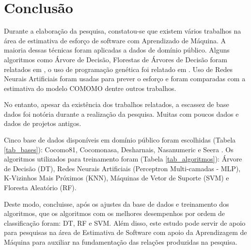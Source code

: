 \documentclass[12pt]{article}
\begin{document}
\section{Conclusão}\label{sec:figs}

Durante a elaboração da pesquisa, constatou-se que existem vários trabalhos na área de estimativa de esforço de software com Aprendizado de Máquina. A maioria dessas técnicas foram aplicadas a dados de domínio público. Alguns algoritmos como Árvore de Decisão, Florestas de Árvores de Decisão foram relatados em \cite{nassifetal:2013}, o uso de programação genética foi relatado em \cite{chavoyaetal:2012}. Uso de Redes Neurais Artificiais foram usadas para prever o esforço e foram comparadas com a estimativa do modelo COMOMO \cite{trontoetal:2007,bhatiaattri:2015} dentre outros trabalhos.

No entanto, apesar da existência dos trabalhos relatados, a escassez de base dados foi notória durante a realização da pesquisa. Muitas com poucos dados e dados de projetos antigos.

Cinco base de dados disponíveis em domínio público foram escolhidas (Tabela \ref{tab_bases}): Cocomo81, Cocomonasa, Desharnais, Nasanumeric e Seera \cite{promise:2005, nasanumeric:2014, seera:2020}. Os algoritmos utilizados para treinamento foram (Tabela \ref{tab_algoritmos}): Árvore de Decisão (DT), Redes Neurais Artificiais (Perceptron Multi-camadas - MLP), K-Vizinhos Mais Próximos (KNN), Máquinas de Vetor de Suporte (SVM) e Floresta Aleatório (RF).

Deste modo, concluisse, após os ajustes da base de dados e treinamento dos algoritmos, que os algoritmos com os melhores desempenhos por ordem de classificação foram: DT, RF e SVM. Além disso, este estudo pode servir de apoio para pesquisas na área de Estimativa de Software com apoio da Aprendizagem de Máquina para auxiliar na fundamentação das relações produzidas na pesquisa.



\end{document}
